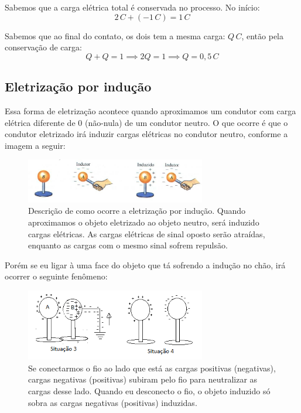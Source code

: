 \documentclass[12pt]{extarticle}
\newcommand{\<}{\langle}
\renewcommand{\>}{\rangle}
\theoremstyle{definition}
\begin{document}
Sabemos que a carga elétrica total é conservada no processo. No início:
\begin{equation*}
    2\,C + (-1\,C) = 1\,C
\end{equation*}

Sabemos que ao final do contato, os dois tem a mesma carga: $Q\,C$, então pela conservação de carga:
\begin{equation*}
    Q + Q = 1 \implies 2Q =1 \implies Q = 0,5 \, C
\end{equation*}

\subsection{Eletrização por indução}
Essa forma de eletrização acontece quando aproximamos um condutor com carga elétrica diferente de 0 (não-nula) de um condutor neutro. O que ocorre é que o condutor eletrizado irá induzir cargas elétricas no condutor neutro, conforme a imagem a seguir:
\begin{figure}[H]
    \centering
    \includegraphics[width=0.7\textwidth]{eletrizacao_por_inducao.jpg}
    \caption{Descrição de como ocorre a eletrização por indução. Quando aproximamos o objeto eletrizado ao objeto neutro, será induzido cargas elétricas. As cargas elétricas de sinal oposto serão atraídas, enquanto as cargas com o mesmo sinal sofrem repulsão.}
    \label{fig:ex_5}
\end{figure}

Porém se eu ligar à uma face do objeto que tá sofrendo a indução no chão, irá ocorrer o seguinte fenômeno:
\begin{figure}[H]
    \centering
    \includegraphics[width=0.7\textwidth]{indução-2.png}
    \caption{Se conectarmos o fio ao lado que está as cargas positivas (negativas), cargas negativas (positivas) subiram pelo fio para neutralizar as cargas desse lado. Quando eu desconecto o fio, o objeto induzido só sobra as cargas negativas (positivas) induzidas.}
    \label{fig:ex_6}
\end{figure}
\end{document}
